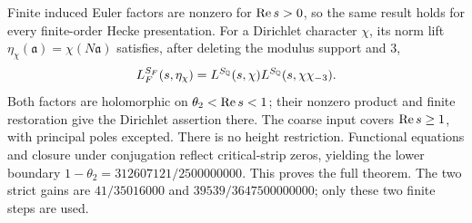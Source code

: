 Finite induced Euler factors are nonzero for \(\operatorname{Re} s>0\), so the
same result holds for every finite-order Hecke presentation.
For a Dirichlet character \(\chi\), its norm lift
\(\eta_\chi(\mathfrak a)=\chi(N\mathfrak a)\) satisfies, after deleting
the modulus support and \(3\),
\[
 L_F^{S_F}(s,\eta_\chi)
 =L^{S_{\mathbb Q}}(s,\chi)L^{S_{\mathbb Q}}(s,\chi\chi_{-3}).
\]
Both factors are holomorphic on \(\theta_2<\operatorname{Re} s<1\); their nonzero
product and finite restoration give the Dirichlet assertion there.
The coarse input covers \(\operatorname{Re} s\ge1\), with principal poles excepted.
There is no height restriction. Functional equations and closure under
conjugation reflect critical-strip zeros, yielding the lower boundary
\(1-\theta_2=312607121/2500000000\). This proves the full theorem.
The two strict gains are \(41/35016000\) and
\(39539/3647500000000\); only these two finite steps are used.
